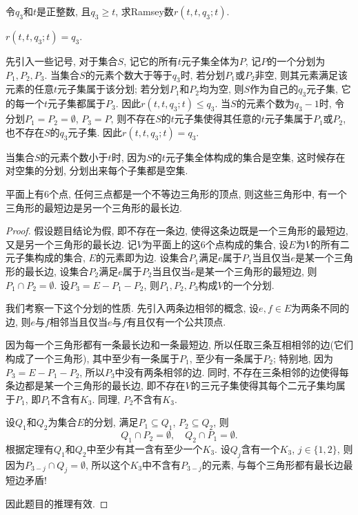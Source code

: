 \documentclass[chinese]{assignment}[2019/10/15]
\begin{document}
    \begin{problem}
        令$q_3$和$t$是正整数, 且$q_3\geq t$, 求Ramsey数$r(t, t, q_3; t)$.
    \end{problem}
    \begin{solution}
        $r(t, t, q_3; t)=q_3$.

        先引入一些记号, 对于集合$S$, 记它的所有$t$元子集全体为$P$, 记$P$的一个分划为$P_1, P_2, P_3$. 当集合$S$的元素个数大于等于$q_3$时, 若分划$P_1$或$P_2$非空, 则其元素满足该元素的任意$t$元子集属于该分划; 若分划$P_1$和$P_2$均为空, 则$S$作为自己的$q_3$元子集, 它的每一个$t$元子集都属于$P_3$. 因此$r(t, t, q_3; t)\leq q_3$. 当$S$的元素个数为$q_3-1$时, 令分划$P_1=P_2=\emptyset$, $P_3=P$, 则不存在$S$的$t$元子集使得其任意的$t$元子集属于$P_1$或$P_2$, 也不存在$S$的$q_3$元子集. 因此$r(t, t, q_3; t)=q_3$.
    \end{solution}
    \begin{note}
        当集合$S$的元素个数小于$t$时, 因为$S$的$t$元子集全体构成的集合是空集, 这时候存在对空集的分划, 分划出来每个子集都是空集.
    \end{note}

    \begin{problem}
       平面上有6个点, 任何三点都是一个不等边三角形的顶点, 则这些三角形中, 有一个三角形的最短边是另一个三角形的最长边.
    \end{problem}
    \begin{proof}
        假设题目结论为假, 即不存在一条边, 使得这条边既是一个三角形的最短边, 又是另一个三角形的最长边. 记$V$为平面上的这6个点构成的集合, 设$E$为$V$的所有二元子集构成的集合, $E$的元素即为边. 设集合$P_1$满足$e$属于$P_1$当且仅当$e$是某一个三角形的最长边, 设集合$P_2$满足$e$属于$P_2$当且仅当$e$是某一个三角形的最短边, 则$P_1\cap P_2=\emptyset$. 设$P_3=E-P_1-P_2$, 则$P_1, P_2, P_3$构成$V$的一个分划.

        我们考察一下这个分划的性质. 先引入两条边相邻的概念, 设$e, f\in E$为两条不同的边, 则$e$与$f$相邻当且仅当$e$与$f$有且仅有一个公共顶点.

        因为每一个三角形都有一条最长边和一条最短边, 所以任取三条互相相邻的边(它们构成了一个三角形), 其中至少有一条属于$P_1$, 至少有一条属于$P_2$; 特别地, 因为$P_3=E-P_1-P_2$, 所以$P_3$中没有两条相邻的边. 同时, 不存在三条相邻的边使得每条边都是某一个三角形的最长边, 即不存在$V$的三元子集使得其每个二元子集均属于$P_1$, 即$P_1$不含有$K_3$. 同理, $P_2$不含有$K_3$.

        设$Q_1$和$Q_2$为集合$E$的分划, 满足$P_1\subseteq Q_1$, $P_2\subseteq Q_2$, 则
        \begin{equation}
            Q_1\cap P_2=\emptyset,\quad Q_2\cap P_1=\emptyset.
        \end{equation}
        根据定理有$Q_1$和$Q_2$中至少有其一含有至少一个$K_3$. 设$Q_j$含有一个$K_3$, $j\in\{1, 2\}$, 则因为$P_{3-j}\cap Q_j=\emptyset$, 所以这个$K_3$中不含有$P_{3-j}$的元素, 与每个三角形都有最长边最短边矛盾!

        因此题目的推理有效.
    \end{proof}
\end{document}
